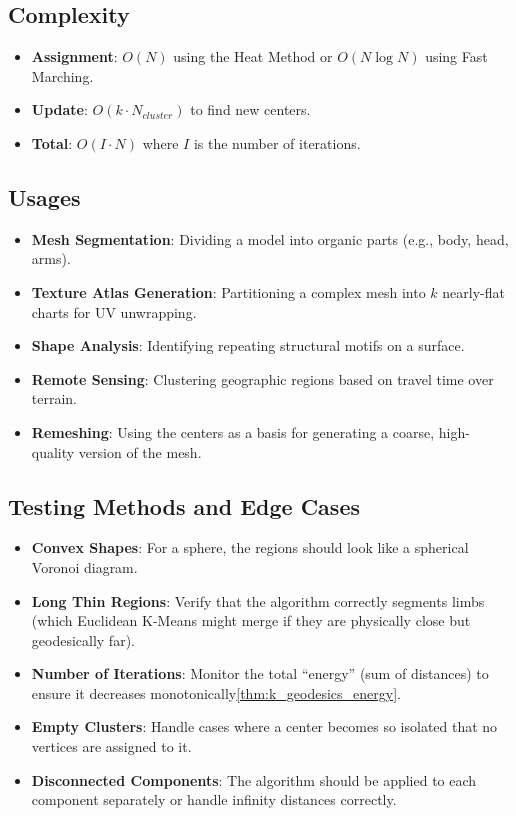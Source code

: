 \subsection{Complexity}
\begin{itemize}
  \item \textbf{Assignment}: $O(N)$ using the Heat Method or $O(N \log N)$ using Fast Marching.
  \item \textbf{Update}: $O(k \cdot N_{cluster})$ to find new centers.
  \item \textbf{Total}: $O(I \cdot N)$ where $I$ is the number of iterations.
\end{itemize}

\subsection{Usages}
\begin{itemize}
  \item \textbf{Mesh Segmentation}: Dividing a model into organic parts (e.g., body, head, arms).
  \item \textbf{Texture Atlas Generation}: Partitioning a complex mesh into $k$ nearly-flat charts for UV unwrapping.
  \item \textbf{Shape Analysis}: Identifying repeating structural motifs on a surface.
  \item \textbf{Remote Sensing}: Clustering geographic regions based on travel time over terrain.
  \item \textbf{Remeshing}: Using the centers as a basis for generating a coarse, high-quality version of the mesh.
\end{itemize}

\subsection{Testing Methods and Edge Cases}
\begin{itemize}
  \item \textbf{Convex Shapes}: For a sphere, the regions should look like a spherical Voronoi diagram.
  \item \textbf{Long Thin Regions}: Verify that the algorithm correctly segments limbs (which Euclidean K-Means might merge if they are physically close but geodesically far).
  \item \textbf{Number of Iterations}: Monitor the total ``energy'' (sum of distances) to ensure it decreases monotonically\cref{thm:k_geodesics_energy}.
  \item \textbf{Empty Clusters}: Handle cases where a center becomes so isolated that no vertices are assigned to it.
  \item \textbf{Disconnected Components}: The algorithm should be applied to each component separately or handle infinity distances correctly.
\end{itemize}

